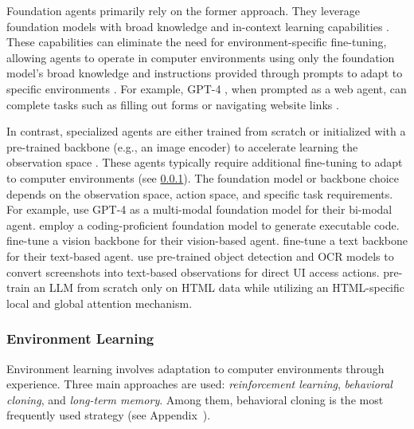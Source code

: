 Foundation agents primarily rely on the former approach. They leverage foundation models with broad knowledge and in-context learning capabilities \citep{brown_language_2020}. These capabilities can eliminate the need for environment-specific fine-tuning, allowing agents to operate in computer environments using only the foundation model's broad knowledge and instructions provided through prompts to adapt to specific environments .
For example, GPT-4 \citep{openai_gpt-4_2024}, when prompted as a web agent, can complete tasks such as filling out forms or navigating website links \citep{zheng_gpt-4vision_2024}.

In contrast, specialized agents are either trained from scratch  or initialized with a pre-trained backbone (e.g., an image encoder) to accelerate learning the observation space \citep{li_mug_2024}. These agents typically require additional fine-tuning to adapt to computer environments (see \cref{sec:environment_adaption}).
% 
The foundation model or backbone choice depends on the observation space, action space, and specific task requirements. For example, 
    \citet{zheng_gpt-4vision_2024} use GPT-4 \citep{openai_gpt-4_2024} as a multi-modal foundation model for their bi-modal agent.
    \citet{gur_real-world_2024} employ a coding-proficient foundation model \citep{chung_scaling_2022} to generate executable code.
    \citet{shaw_pixels_2023} fine-tune a vision backbone for their vision-based agent.
    \citet{iki_berts_2022} fine-tune a text backbone for their text-based agent.
    \citet{song_visiontasker_2024} use pre-trained object detection and OCR models to convert screenshots into text-based observations for direct UI access actions.
    \citet{gur_real-world_2024} pre-train an LLM from scratch only on HTML data while utilizing an HTML-specific local and global attention mechanism.

\subsubsection{Environment Learning}\label{sec:environment_adaption}
Environment learning involves adaptation to computer environments through experience. Three main approaches are used: \emph{reinforcement learning}, \emph{behavioral cloning}, and \emph{long-term memory}. Among them, behavioral cloning is the most frequently used strategy (see Appendix~). 


